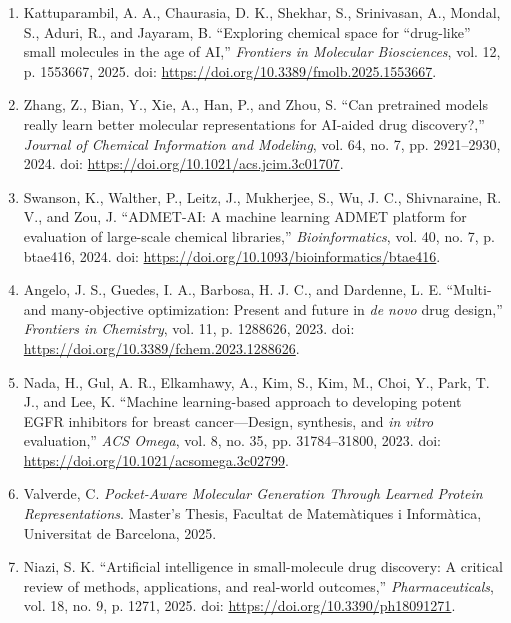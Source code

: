 \documentclass[IB]{TFUOC}%
\begin{document}
\begingroup
\sloppy
\begin{enumerate}
\item \label{ref:kattuparambil2025} Kattuparambil, A. A., Chaurasia, D. K., Shekhar, S., Srinivasan, A., Mondal, S., Aduri, R., and Jayaram, B.  
``Exploring chemical space for ``drug-like'' small molecules in the age of AI,''  
\textit{Frontiers in Molecular Biosciences}, vol. 12, p. 1553667, 2025.  
doi: \url{https://doi.org/10.3389/fmolb.2025.1553667}.

\item \label{ref:zhang2024} Zhang, Z., Bian, Y., Xie, A., Han, P., and Zhou, S.  
``Can pretrained models really learn better molecular representations for AI-aided drug discovery?,''  
\textit{Journal of Chemical Information and Modeling}, vol. 64, no. 7, pp. 2921--2930, 2024.  
doi: \url{https://doi.org/10.1021/acs.jcim.3c01707}.

\item \label{ref:swanson2024} Swanson, K., Walther, P., Leitz, J., Mukherjee, S., Wu, J. C., Shivnaraine, R. V., and Zou, J.  
``ADMET-AI: A machine learning ADMET platform for evaluation of large-scale chemical libraries,''  
\textit{Bioinformatics}, vol. 40, no. 7, p. btae416, 2024.  
doi: \url{https://doi.org/10.1093/bioinformatics/btae416}.

\item \label{ref:angelo2023} Angelo, J. S., Guedes, I. A., Barbosa, H. J. C., and Dardenne, L. E.  
``Multi- and many-objective optimization: Present and future in \textit{de novo} drug design,''  
\textit{Frontiers in Chemistry}, vol. 11, p. 1288626, 2023.  
doi: \url{https://doi.org/10.3389/fchem.2023.1288626}.

\item \label{ref:nada2023} Nada, H., Gul, A. R., Elkamhawy, A., Kim, S., Kim, M., Choi, Y., Park, T. J., and Lee, K.  
``Machine learning-based approach to developing potent EGFR inhibitors for breast cancer---Design, synthesis, and \textit{in vitro} evaluation,''  
\textit{ACS Omega}, vol. 8, no. 35, pp. 31784--31800, 2023.  
doi: \url{https://doi.org/10.1021/acsomega.3c02799}.

\item \label{ref:valverde2025} Valverde, C.  
\textit{Pocket-Aware Molecular Generation Through Learned Protein Representations}.  
Master's Thesis, Facultat de Matemàtiques i Informàtica, Universitat de Barcelona, 2025.

\item \label{ref:niazi2025} Niazi, S. K.  
``Artificial intelligence in small-molecule drug discovery: A critical review of methods, applications, and real-world outcomes,''  
\textit{Pharmaceuticals}, vol. 18, no. 9, p. 1271, 2025.  
doi: \url{https://doi.org/10.3390/ph18091271}.


\end{enumerate}
\end{document}
